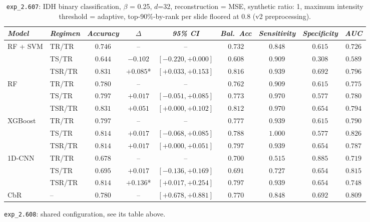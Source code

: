 \begin{table}[H]
\label{tab:ctrl_exp_2.607}
\begin{tabular*}{\textwidth}{@{\extracolsep{\fill}}llccccccc}
\toprule
\emph{Model} & \emph{Regimen} & \emph{Accuracy} & \emph{$\Delta$} & \emph{95\% CI} & \emph{Bal.\ Acc} & \emph{Sensitivity} & \emph{Specificity} & \emph{AUC}\\
\midrule
\multirow{3}{*}{RF + SVM} & TR/TR & $0.746$ & -- & -- & $0.732$ & $0.848$ & $0.615$ & $0.726$\\
 & TS/TR & $0.644$ & $-0.102$ & $[-0.220, +0.000]$ & $0.608$ & $0.909$ & $0.308$ & $0.589$\\
 & TSR/TR & $0.831$ & $+0.085$* & $[+0.033, +0.153]$ & $0.816$ & $0.939$ & $0.692$ & $0.796$\\
\midrule
\multirow{3}{*}{RF} & TR/TR & $0.780$ & -- & -- & $0.762$ & $0.909$ & $0.615$ & $0.775$\\
 & TS/TR & $0.797$ & $+0.017$ & $[-0.051, +0.085]$ & $0.773$ & $0.970$ & $0.577$ & $0.780$\\
 & TSR/TR & $0.831$ & $+0.051$ & $[+0.000, +0.102]$ & $0.812$ & $0.970$ & $0.654$ & $0.794$\\
\midrule
\multirow{3}{*}{XGBoost} & TR/TR & $0.797$ & -- & -- & $0.777$ & $0.939$ & $0.615$ & $0.790$\\
 & TS/TR & $0.814$ & $+0.017$ & $[-0.068, +0.085]$ & $0.788$ & $1.000$ & $0.577$ & $0.826$\\
 & TSR/TR & $0.814$ & $+0.017$ & $[+0.000, +0.051]$ & $0.797$ & $0.939$ & $0.654$ & $0.787$\\
\midrule
\multirow{3}{*}{1D-CNN} & TR/TR & $0.678$ & -- & -- & $0.700$ & $0.515$ & $0.885$ & $0.719$\\
 & TS/TR & $0.695$ & $+0.017$ & $[-0.136, +0.169]$ & $0.691$ & $0.727$ & $0.654$ & $0.815$\\
 & TSR/TR & $0.814$ & $+0.136$* & $[+0.017, +0.254]$ & $0.797$ & $0.939$ & $0.654$ & $0.748$\\
\midrule
CbR & -- & $0.780$ & -- & $[+0.678, +0.881]$ & $0.770$ & $0.848$ & $0.692$ & $0.809$\\
\bottomrule
\end{tabular*}
\caption{\small \texttt{exp\_2.607}: IDH binary classification, $\beta$ = 0.25, $d$=32, reconstruction = MSE, synthetic ratio: 1, maximum intensity threshold = adaptive, top-90\%-by-rank per slide floored at $0.8$ (v2 preprocessing).}
\end{table}

\texttt{exp\_2.608}: shared configuration, see its table above.

